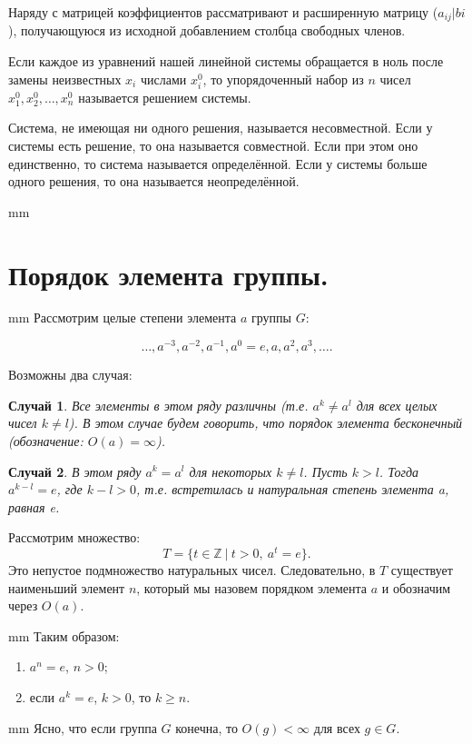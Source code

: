 \documentclass[12pt,english,russian]{article}
\newtheorem{sluch}{Случай}
\begin{document}
	Наряду с матрицей коэффициентов рассматривают и
	расширенную матрицу
	($a_{ij}|bi$), получающуюся из исходной добавлением столбца свободных членов.

	Если каждое из уравнений нашей линейной системы обращается в ноль после замены неизвестных 
	$x_i$ числами
	$x_i^0$, то упорядоченный набор из $n$ чисел
	$x_1^0, x_2^0, \dots , x_n^0$ называется решением
	системы. 

	Система, не имеющая ни одного решения, называется
	несовместной. Если у системы есть решение, то она называется
	совместной. Если при этом оно единственно, то система называется
	определённой. Если у системы больше одного решения, то она называется
	неопределённой.
	
	 mm
		\section{\bf Порядок элемента группы.}
	
	 mm
	Рассмотрим целые степени элемента $a$ группы $G$:
	
	$$\dots ,a^{-3},a^{-2},a^{-1},a^0 = e,a,a^2,a^3,\dots.$$
	
	Возможны два случая:
	\begin{sluch}
		Все элементы в этом ряду различны (т.е. $a^k \ne a^l$ для 
		всех целых чисел $k\ne l$). В этом случае будем говорить, 
		что порядок элемента бесконечный (обозначение: $O(a) = \infty$).
	\end{sluch}
	
	\begin{sluch}
		В этом ряду $a^k = a^l$ для некоторых $k \ne l$. Пусть $k > l$. 
		Тогда $a^{k-l}=e$, где $k-l > 0$, т.е. встретилась и натуральная 
		степень элемента a, равная e. 
	\end{sluch}
	Рассмотрим множество:
	\begin{equation}
		T = \{t \in \mathbb{Z} \ | \ t>0, \ a^t = e\}.
	\end{equation}
	Это непустое подмножество натуральных чисел. Следовательно, в
	$T$ существует наименьший элемент $n$, который мы назовем порядком элемента $a$
	и обозначим через $O(a)$.
	
		 mm
	Таким образом:
	\begin{enumerate}
		\item $a^n=e$, $n>0$;
		\item если $a^k=e$, $k>0$, то $k\geqslant n$.
	\end{enumerate}
	
	 mm
	Ясно, что если группа $G$ конечна, то $O(g) < \infty$ для 
	всех $g\in G$.
	
\end{document}
